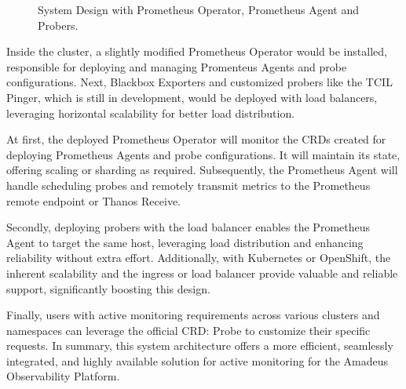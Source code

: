 \begin{figure}[htpb]
  \caption[System Design]{System Design with Prometheus Operator, Prometheus Agent and Probers.}\label{fig:system-design}
\end{figure}

Inside the cluster, a slightly modified Prometheus Operator would be installed, responsible for deploying and managing Promenteus Agents and probe configurations. Next, Blackbox Exporters and customized probers like the \ac{TCIL} Pinger, which is still in development, would be deployed with load balancers, leveraging horizontal scalability for better load distribution. 

At first, the deployed Prometheus Operator will monitor the \ac{CRD}s created for deploying Prometheus Agents and probe configurations. It will maintain its state, offering scaling or sharding as required. Subsequently, the Prometheus Agent will handle scheduling probes and remotely transmit metrics to the Prometheus remote endpoint or Thanos Receive. 

Secondly, deploying probers with the load balancer enables the Prometheus Agent to target the same host, leveraging load distribution and enhancing reliability without extra effort. Additionally, with Kubernetes or OpenShift, the inherent scalability and the ingress or load balancer provide valuable and reliable support, significantly boosting this design. 

Finally, users with active monitoring requirements across various clusters and namespaces can leverage the official \ac{CRD}: Probe to customize their specific requests. In summary, this system architecture offers a more efficient, seamlessly integrated, and highly available solution for active monitoring for the Amadeus Observability Platform. 

